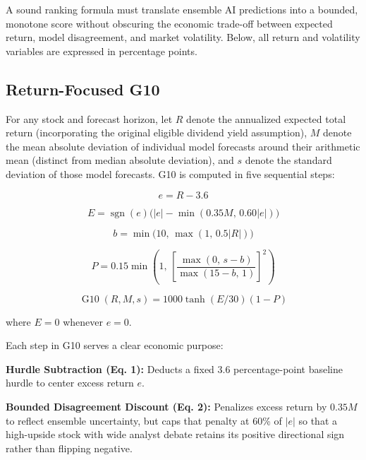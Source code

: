 \documentclass[11pt,a4paper]{article}
\numberwithin{table}{section}
\begin{document}
A sound ranking formula must translate ensemble AI predictions into a bounded, monotone score without obscuring the economic trade-off between expected return, model disagreement, and market volatility. Below, all return and volatility variables are expressed in percentage points.

\subsection{Return-Focused G10}

For any stock and forecast horizon, let $R$ denote the annualized expected total return (incorporating the original eligible dividend yield assumption), $M$ denote the mean absolute deviation of individual model forecasts around their arithmetic mean (distinct from median absolute deviation), and $s$ denote the standard deviation of those model forecasts. G10 is computed in five sequential steps:

\begin{equation}e = R - 3.6 \end{equation}

\begin{equation}E = \operatorname{sgn}(e)\Big(|e| - \min(0.35M,\, 0.60|e|)\Big) \end{equation}

\begin{equation}b = \min\Big(10,\, \max(1,\, 0.5|R|)\Big) \end{equation}

\begin{equation}P = 0.15\min\left(1,\, \left[\frac{\max(0,\, s - b)}{\max(15 - b,\, 1)}\right]^2\right) \end{equation}

\begin{equation}\operatorname{G10}(R, M, s) = 1000\tanh(E / 30)(1 - P) \end{equation}

where $E = 0$ whenever $e = 0$.

Each step in G10 serves a clear economic purpose:

\textbf{Hurdle Subtraction (Eq. 1):}  Deducts a fixed 3.6 percentage-point baseline hurdle to center excess return $e$.

\textbf{Bounded Disagreement Discount (Eq. 2):}  Penalizes excess return by $0.35M$ to reflect ensemble uncertainty, but caps that penalty at 60\% of $|e|$ so that a high-upside stock with wide analyst debate retains its positive directional sign rather than flipping negative.
\end{document}
